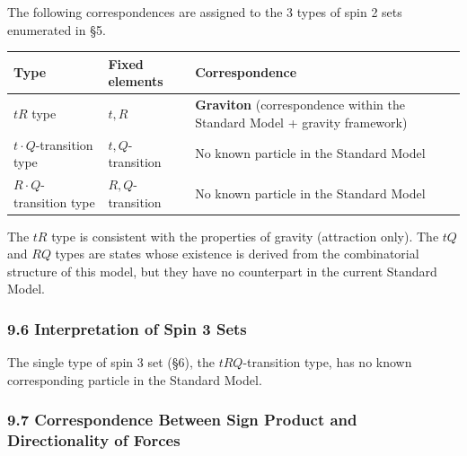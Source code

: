 \documentclass[
  a4paper,11pt]{article}
\newcounter{none}
\theoremstyle{definition}
\theoremstyle{remark}
\begin{document}
The following correspondences are assigned to the 3 types of spin 2 sets
enumerated in §5.

{\def\LTcaptype{none} %
\begin{longtable}[]{@{}
  >{\raggedright\arraybackslash}p{}
  >{\raggedright\arraybackslash}p{}
  >{\raggedright\arraybackslash}p{}@{}}
\toprule\noalign{}
\begin{minipage}[b]{\linewidth}\raggedright
Type
\end{minipage} & \begin{minipage}[b]{\linewidth}\raggedright
Fixed elements
\end{minipage} & \begin{minipage}[b]{\linewidth}\raggedright
Correspondence
\end{minipage} \\
\midrule\noalign{}
\endhead
\bottomrule\noalign{}
\endlastfoot
\(tR\) type & \(t, R\) & \textbf{Graviton} (correspondence within the
Standard Model + gravity framework) \\
\(t \cdot Q\)-transition type & \(t, Q\)-transition & No known particle
in the Standard Model \\
\(R \cdot Q\)-transition type & \(R, Q\)-transition & No known particle
in the Standard Model \\
\end{longtable}
}

The \(tR\) type is consistent with the properties of gravity (attraction
only). The \(tQ\) and \(RQ\) types are states whose existence is derived
from the combinatorial structure of this model, but they have no
counterpart in the current Standard Model.

\subsubsection{9.6 Interpretation of Spin 3
Sets}\label{interpretation-of-spin-3-sets}

The single type of spin 3 set (§6), the \(tRQ\)-transition type, has no
known corresponding particle in the Standard Model.

\subsubsection{9.7 Correspondence Between Sign Product and
Directionality of
Forces}\label{correspondence-between-sign-product-and-directionality-of-forces}
\end{document}
